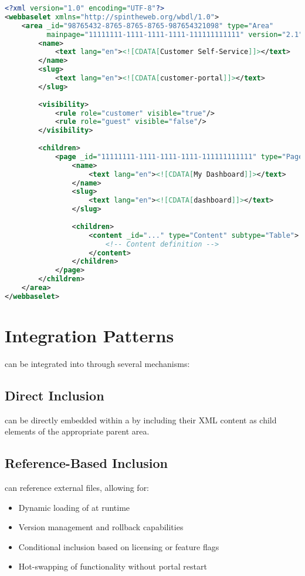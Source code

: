 \begin{lstlisting}[language=XML,caption={Example Webbaselet Structure}]
<?xml version="1.0" encoding="UTF-8"?>
<webbaselet xmlns="http://spintheweb.org/wbdl/1.0">
	<area _id="98765432-8765-8765-8765-987654321098" type="Area" 
		  mainpage="11111111-1111-1111-1111-111111111111" version="2.1">
		<name>
			<text lang="en"><![CDATA[Customer Self-Service]]></text>
		</name>
		<slug>
			<text lang="en"><![CDATA[customer-portal]]></text>
		</slug>
        
		<visibility>
			<rule role="customer" visible="true"/>
			<rule role="guest" visible="false"/>
		</visibility>
        
		<children>
			<page _id="11111111-1111-1111-1111-111111111111" type="Page">
				<name>
					<text lang="en"><![CDATA[My Dashboard]]></text>
				</name>
				<slug>
					<text lang="en"><![CDATA[dashboard]]></text>
				</slug>
                
				<children>
					<content _id="..." type="Content" subtype="Table">
						<!-- Content definition -->
					</content>
				</children>
			</page>
		</children>
	</area>
</webbaselet>
\end{lstlisting}

\section{Integration Patterns}
\label{sec:integration-patterns}

 can be integrated into  through several mechanisms:

\subsection{Direct Inclusion}

 can be directly embedded within a \webbase{} by including their XML content as child elements of the appropriate parent area.

\subsection{Reference-Based Inclusion}

 can reference external \webbaselet{} files, allowing for:
\begin{itemize}
\item Dynamic loading of  at runtime
\item Version management and rollback capabilities
\item Conditional inclusion based on licensing or feature flags
\item Hot-swapping of functionality without portal restart
\end{itemize}

